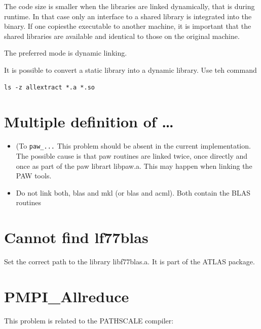 \documentclass[a4paper,10pt]{report}
\newcommand{\mytt}[1]{{\tt #1}}
\begin{document}
The code size is smaller when the libraries are linked dynamically,
that is during runtime. In that case only an interface to a shared
library is integrated into the binary. If one copiesthe executable to
another machine, it is important that the shared libraries are
available and identical to those on the original machine.

The preferred mode is dynamic linking.

It is possible to convert a static library into a dynamic library. Use teh command
\begin{verbatim}
ls -z allextract *.a *.so
\end{verbatim}



\section{Multiple definition of \ldots}
\begin{itemize}
\item (To \mytt{paw\_...} This problem should be absent in the current implementation.
The possible cause is that paw routines are linked twice, once
directly and once as part of the paw librart libpaw.a. This may happen
when linking the PAW tools.
\item Do not link both, blas and mkl (or blas and acml). Both contain the BLAS routines
\end{itemize}


\section{Cannot find lf77blas}

Set the correct path to the library libf77blas.a. It is part of the ATLAS package. 


\section{PMPI\_Allreduce}
This problem is related to the PATHSCALE compiler:
\end{document}
